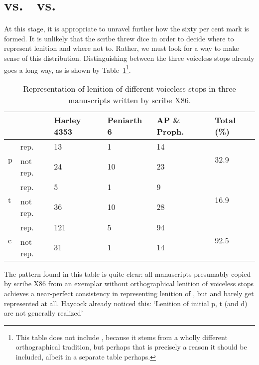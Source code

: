 \section{ vs.\  vs.\ }
At this stage, it is appropriate to unravel further how the sixty per cent mark is formed. It is unlikely that the scribe threw dice in order to decide where to represent lenition and where not to. Rather, we must look for a way to make sense of this distribution. Distinguishing between the three voiceless stops already goes a long way, as is shown by Table~\ref{perclenptcx86}\footnote{This table does not include , because it stems from a wholly different orthographical tradition, but perhaps that is precisely a reason it should be included, albeit in a separate table perhaps.}.


\begin{table}[h]
\centering
\begin{tabular}{@{}llllll@{}}
\toprule
\textbf{} & \textbf{\textbf{}} & \textbf{\textbf{Harley 4353}} & \textbf{\textbf{Peniarth 6}} & \textbf{AP \& Proph.} & \textbf{\textbf{Total (\%)}} \\ \midrule
\multirow{2}{*}{p} & rep. & 13 & 1 & 14 & \multirow{2}{*}{32.9} \\
 & not rep. & 24 & 10 & 23 &  \\
\multirow{2}{*}{t} & rep. & 5 & 1 & 9 & \multirow{2}{*}{16.9} \\
 & not rep. & 36 & 10 & 28 &  \\
\multirow{2}{*}{c} & rep. & 121 & 5 & 94 & \multirow{2}{*}{92.5} \\
 & not rep. & 31 & 1 & 14 &  \\ \bottomrule
\end{tabular}
\caption{Representation of lenition of different voiceless stops in three manuscripts written by scribe X86.}
\label{perclenptcx86}
\end{table}

The pattern found in this table is quite clear: all manuscripts presumably copied by scribe X86 from an exemplar without orthographical lenition of voiceless stops achieves a near-perfect consistency in representing lenition of , but  and  barely get represented at all. Haycock already noticed this: `Lenition of initial p, t (and d) are not generally realized' \autocite[p.~7, n.~18]{haycock_legendary_2015}



